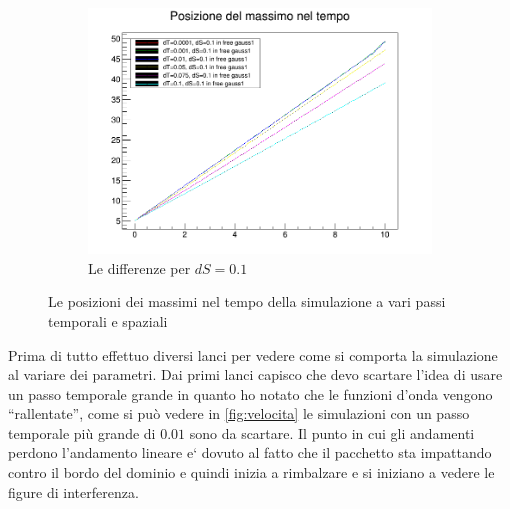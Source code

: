 \begin{figure}[hbt]
\begin{subfigure}[b]{0.3\textwidth}
		\includegraphics[width=\textwidth]{IMG/v_g1_01}
		\caption[Differenze in 0.1]{Le differenze per $dS = 0.1$}
	\end{subfigure}
	\caption{Le posizioni dei massimi nel tempo della simulazione a vari passi temporali  e spaziali}\label{fig:velocita}
\end{figure}

Prima di tutto effettuo diversi lanci per vedere come si comporta la simulazione al variare dei parametri.
Dai primi lanci capisco che devo scartare l'idea di usare un passo temporale grande in quanto ho notato che le funzioni d'onda vengono ``rallentate'', come si pu\`o vedere in \autoref{fig:velocita} le simulazioni con un passo temporale pi\`u grande di $0.01$ sono da scartare. Il punto in cui gli andamenti perdono l'andamento lineare e` dovuto al fatto che il pacchetto sta impattando contro il bordo del dominio e quindi inizia a rimbalzare e si iniziano a vedere le figure di interferenza.


